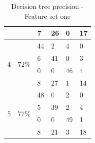 \documentclass[USenglish]{ifimaster}  %
\begin{document}
\begin{table}[h]
\begin{tabular}{@{}llllll@{}}
			\multicolumn{1}{l|}{} & \multicolumn{1}{l|}{} & \multicolumn{1}{l|}{7} & \multicolumn{1}{l|}{26} & \multicolumn{1}{l|}{0} & 17 \\ \midrule
			\multicolumn{1}{l|}{\multirow{4}{*}{4}} & \multicolumn{1}{l|}{\multirow{4}{*}{72\%}} & \multicolumn{1}{l|}{44} & \multicolumn{1}{l|}{2} & \multicolumn{1}{l|}{4} & 0 \\ \cmidrule(l){3-6} 
			\multicolumn{1}{l|}{} & \multicolumn{1}{l|}{} & \multicolumn{1}{l|}{6} & \multicolumn{1}{l|}{41} & \multicolumn{1}{l|}{0} & 3 \\ \cmidrule(l){3-6} 
			\multicolumn{1}{l|}{} & \multicolumn{1}{l|}{} & \multicolumn{1}{l|}{0} & \multicolumn{1}{l|}{0} & \multicolumn{1}{l|}{46} & 4 \\ \cmidrule(l){3-6} 
			\multicolumn{1}{l|}{} & \multicolumn{1}{l|}{} & \multicolumn{1}{l|}{8} & \multicolumn{1}{l|}{27} & \multicolumn{1}{l|}{1} & 14 \\ \midrule
			\multicolumn{1}{l|}{\multirow{4}{*}{5}} & \multicolumn{1}{l|}{\multirow{4}{*}{77\%}} & \multicolumn{1}{l|}{48} & \multicolumn{1}{l|}{0} & \multicolumn{1}{l|}{2} & 0 \\ \cmidrule(l){3-6} 
			\multicolumn{1}{l|}{} & \multicolumn{1}{l|}{} & \multicolumn{1}{l|}{5} & \multicolumn{1}{l|}{39} & \multicolumn{1}{l|}{2} & 4 \\ \cmidrule(l){3-6} 
			\multicolumn{1}{l|}{} & \multicolumn{1}{l|}{} & \multicolumn{1}{l|}{0} & \multicolumn{1}{l|}{0} & \multicolumn{1}{l|}{49} & 1 \\ \cmidrule(l){3-6} 
			\multicolumn{1}{l|}{} & \multicolumn{1}{l|}{} & \multicolumn{1}{l|}{8} & \multicolumn{1}{l|}{21} & \multicolumn{1}{l|}{3} & 18 \\ \bottomrule
		\end{tabular}
		\caption{Decision tree precision - Feature set one}
		\label{dt1e}
	\end{table}
	\FloatBarrier
\end{document}
